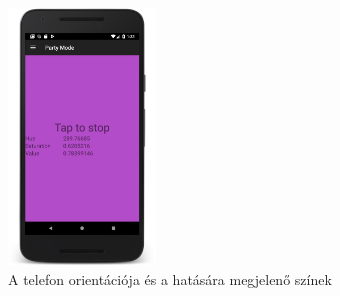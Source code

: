 \documentclass[../main.tex]{subfiles}
\begin{document}
\begin{figure}[h!]
                    \includegraphics[height=6.8cm]{android_res/screen_pictures/phone_orientation_22}
                \caption{A telefon orientációja és a hatására megjelenő színek}
                \label{fig:party_mode}
            \end{figure}
    \vspace{0.8cm}
\end{document}
